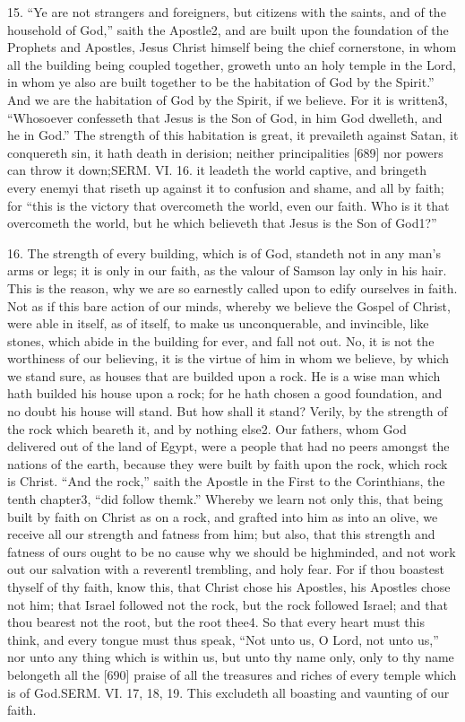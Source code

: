 15. “Ye are not strangers and foreigners, but citizens with the saints, and of the household of God,” saith the Apostle2, and are built upon the foundation of the Prophets and Apostles, Jesus Christ himself being the chief cornerstone, in whom all the building being coupled together, groweth unto an holy temple in the Lord, in whom ye also are built together to be the habitation of God by the Spirit.” And we are the habitation of God by the Spirit, if we believe. For it is written3, “Whosoever confesseth that Jesus is the Son of God, in him God dwelleth, and he in God.” The strength of this habitation is great, it prevaileth against Satan, it conquereth sin, it hath death in derision; neither principalities [689] nor powers can throw it down;SERM. VI. 16. it leadeth the world captive, and bringeth every enemyi that riseth up against it to confusion and shame, and all by faith; for “this is the victory that overcometh the world, even our faith. Who is it that overcometh the world, but he which believeth that Jesus is the Son of God1?”

16. The strength of every building, which is of God, standeth not in any man’s arms or legs; it is only in our faith, as the valour of Samson lay only in his hair. This is the reason, why we are so earnestly called upon to edify ourselves in faith. Not as if this bare action of our minds, whereby we believe the Gospel of Christ, were able in itself, as of itself, to make us unconquerable, and invincible, like stones, which abide in the building for ever, and fall not out. No, it is not the worthiness of our believing, it is the virtue of him in whom we believe, by which we stand sure, as houses that are builded upon a rock. He is a wise man which hath builded his house upon a rock; for he hath chosen a good foundation, and no doubt his house will stand. But how shall it stand? Verily, by the strength of the rock which beareth it, and by nothing else2. Our fathers, whom God delivered out of the land of Egypt, were a people that had no peers amongst the nations of the earth, because they were built by faith upon the rock, which rock is Christ. “And the rock,” saith the Apostle in the First to the Corinthians, the tenth chapter3, “did follow themk.” Whereby we learn not only this, that being built by faith on Christ as on a rock, and grafted into him as into an olive, we receive all our strength and fatness from him; but also, that this strength and fatness of ours ought to be no cause why we should be highminded, and not work out our salvation with a reverentl trembling, and holy fear. For if thou boastest thyself of thy faith, know this, that Christ chose his Apostles, his Apostles chose not him; that Israel followed not the rock, but the rock followed Israel; and that thou bearest not the root, but the root thee4. So that every heart must this think, and every tongue must thus speak, “Not unto us, O Lord, not unto us,” nor unto any thing which is within us, but unto thy name only, only to thy name belongeth all the [690] praise of all the treasures and riches of every temple which is of God.SERM. VI. 17, 18, 19. This excludeth all boasting and vaunting of our faith.


